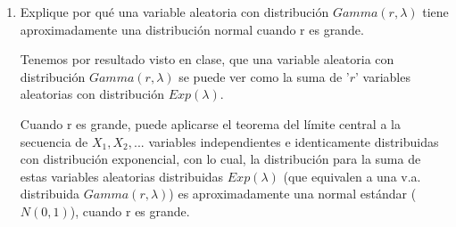\documentclass[11pt,a4paper]{report}
\begin{document}
\begin{enumerate}
{		}

		\item{

			Explique por qué una variable aleatoria con distribución 
			$Gamma(r,\lambda)$ tiene aproximadamente una distribución normal 
			cuando r es grande. \\
		}

			Tenemos por resultado visto en clase, que una variable aleatoria con
			distribución $Gamma(r, \lambda)$ se puede ver como la suma de '$r$'
			variables aleatorias con distribución $Exp(\lambda)$. 

			
			Cuando r es grande, puede aplicarse el teorema del límite central
			a la secuencia de $X_1, X_2, ...$ variables independientes e 
			identicamente distribuidas con distribución exponencial, con lo cual,
			la distribución para la suma de estas variables aleatorias distribuidas 
			$Exp(\lambda)$ (que equivalen a una v.a. distribuida $Gamma(r, \lambda)$)
			es aproximadamente una normal estándar ($N(0,1)$), cuando r es grande.
		
	\end{enumerate}
\end{document}
